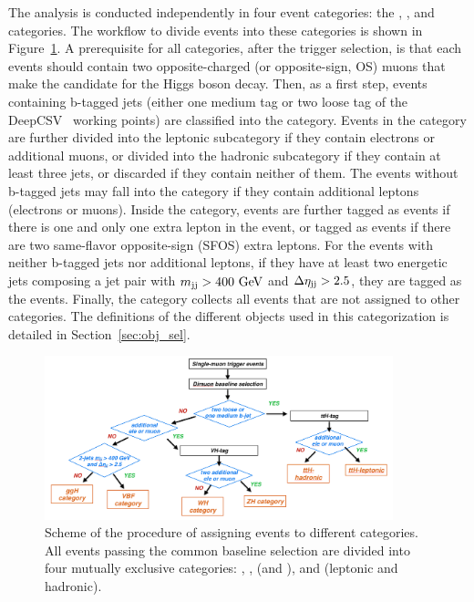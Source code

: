 The \hmm analysis is conducted independently in four event categories: the \ggH, \qqH, \VH and \ttH categories.
The workflow to divide events into these categories is shown in Figure~\ref{fig:event_categories}.
A prerequisite for all categories, after the trigger selection, 
is that each events should contain two opposite-charged (or opposite-sign, OS) muons that make the candidate for the Higgs boson decay. 
Then, as a first step, events containing b-tagged jets (either one medium tag or two loose tag of the DeepCSV~\cite{Sirunyan:2017ezt} working points) are classified into the \ttH category.
Events in the \ttH category are further divided into the \ttH leptonic subcategory if they contain electrons or additional muons,
or divided into the \ttH hadronic subcategory if they contain at least three jets,
or discarded if they contain neither of them.
The events without b-tagged jets may fall into the \VH category if they contain additional leptons (electrons or muons).
Inside the \VH category, events are further tagged as \WH events if there is one and only one extra lepton in the event, 
or tagged as \ZH events if there are two same-flavor opposite-sign (SFOS) extra leptons.
For the events with neither b-tagged jets nor additional leptons, 
if they have at least two energetic jets composing a jet pair with $m_{\mathrm{jj}} > 400~\mbox{GeV}$ and $\Delta\eta_{\mathrm{jj}} > 2.5$, 
they are tagged as the \qqH events.
Finally, the \ggH category collects all events that are not assigned to other categories. 
The definitions of the different objects used in this categorization is detailed in Section~\ref{sec:obj_sel}.

\begin{figure}[!htb]
    \centering
    \captionsetup{justification=justified}
    \includegraphics[width=0.9\textwidth]{pics/category_scheme.png}
    \caption{Scheme of the procedure of assigning events to different categories. All events passing the common baseline selection
             are divided into four mutually exclusive categories: \ggH, \qqH, \VH (\WH and \ZH), and \ttH (leptonic and hadronic).}
    \label{fig:event_categories}
\end{figure}


